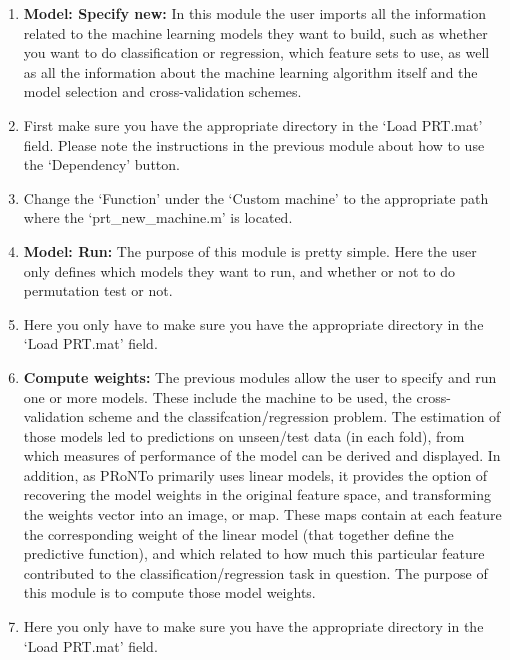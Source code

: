\begin{enumerate}
\noindent \textbf{Note:} When you first create a batch of jobs in the Batch, there is no `PRT.mat' yet created. In that case you can either run the first module by itself, and then click `Specify' to choose the already created PRT.mat, and then run the rest of the modules. Or you can run them all together by using the `Dependency' button. By clicking the `Dependency' button you can choose for example the `Data \& Design' module, which instructs the `Load PRT.mat' field of the `Feature set/Kernel' module to harvest the `PRT.mat' of the `Data \& Design' module to be run as the PRT.mat of this module (`Feature set/Kernel').

\ei

\item \textbf{Model: Specify new:} In this module the user imports all the information related to the machine learning models they want to build, such as whether you want to do classification or regression, which feature sets to use, as well as all the information about the machine learning algorithm itself and the model selection and cross-validation schemes.

\bi
\item First make sure you have the appropriate directory in the `Load PRT.mat' field. Please note the instructions in the previous module about how to use the `Dependency' button.
\item Change the `Function' under the `Custom machine' to the appropriate path where the `prt\_new\_machine.m' is located.
\ei

\item \textbf{Model: Run:} The purpose of this module is pretty simple. Here the user only defines which models they want to run, and whether or not to do permutation test or not.

\bi
\item Here you only have to make sure you have the appropriate directory in the `Load PRT.mat' field.
\ei

\item \textbf{Compute weights:} The previous modules allow the user to specify and run one or more models. These include the machine to be used, the cross-validation scheme and the classifcation/regression problem. The estimation of those models led to predictions on unseen/test data (in each fold), from which measures of performance of the model can be derived
and displayed. In addition, as PRoNTo primarily uses linear models, it provides the option of recovering the model weights in the original feature space, and transforming the weights vector into an image, or map. These maps contain at each feature the corresponding weight of the linear model (that together define the predictive function), and which related to how much this particular feature contributed to the classification/regression task in question. The purpose of this module is to compute those model weights.

\bi
\item Here you only have to make sure you have the appropriate directory in the `Load PRT.mat' field.
\ei

\end{enumerate}

